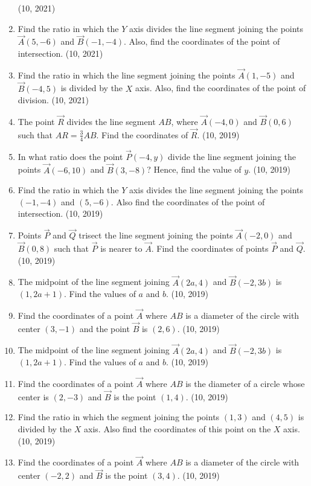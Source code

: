 \begin{enumerate}[label=\thesubsection.\arabic*,ref=\thesubsection.\theenumi]
			\hfill (10, 2021)
		\item Find the ratio in which the $Y$ axis divides the line segment joining the points $\vec{A}(5, -6)$ and $\vec{B}(-1, -4)$. Also, find the coordinates of the point of intersection. \hfill (10, 2021)
		\item Find the ratio in which the line segment joining the points $\vec{A}(1, -5)$ and $\vec{B}(-4, 5)$ is divided by the $X$ axis. Also, find the coordinates of the point of division. \hfill (10, 2021)
\item The point $\vec{R}$ divides the line segment $AB$, where $\vec{A}(-4, 0)$ and $\vec{B}(0, 6)$ such that $AR = \frac{3}{4} AB$. Find the coordinates of $\vec{R}$. \hfill (10, 2019)
\item In what ratio does the point $\vec{P}(-4, y)$ divide the line segment joining the points $\vec{A}(-6, 10)$ and $\vec{B}(3, -8)$? Hence, find the value of $y$. \hfill (10, 2019)
\item Find the ratio in which the $Y$ axis divides the line segment joining the points $(-1, -4)$ and $(5, -6)$. Also find the coordinates of the point of intersection. \hfill (10, 2019)
\item Points $\vec{P}$ and $\vec{Q}$ trisect the line segment joining the points $\vec{A}(-2, 0)$ and $\vec{B}(0, 8)$ such that $\vec{P}$ is nearer to $\vec{A}$. Find the coordinates of points $\vec{P}$ and $\vec{Q}$. \hfill (10, 2019)
\item The midpoint of the line segment joining $\vec{A}(2a, 4)$ and $\vec{B}(-2, 3b)$ is $(1, 2a + 1)$. Find the values of $a$ and $b$. \hfill (10, 2019)
\item Find the coordinates of a point $\vec{A}$ where $AB$ is a diameter of the circle with center $(3, -1)$ and the point $\vec{B}$ is $(2, 6)$. \hfill (10, 2019)
\item The midpoint of the line segment joining $\vec{A}(2a, 4)$ and $\vec{B}(-2, 3b)$ is $(1, 2a + 1)$. Find the values of $a$ and $b$. \hfill (10, 2019)
\item Find the coordinates of a point $\vec{A}$ where $AB$ is the diameter of a circle whose center is $(2, -3)$ and $\vec{B}$ is the point $(1, 4)$. \hfill (10, 2019)
\item Find the ratio in which the segment joining the points $(1, 3)$ and $(4, 5)$ is divided by the $X$ axis. Also find the coordinates of this point on the $X$ axis. \hfill (10, 2019)
\item Find the coordinates of a point $\vec{A}$ where $AB$ is a diameter of the circle with center $(-2, 2)$ and $\vec{B}$ is the point $(3, 4)$. \hfill (10, 2019)

\end{enumerate}
